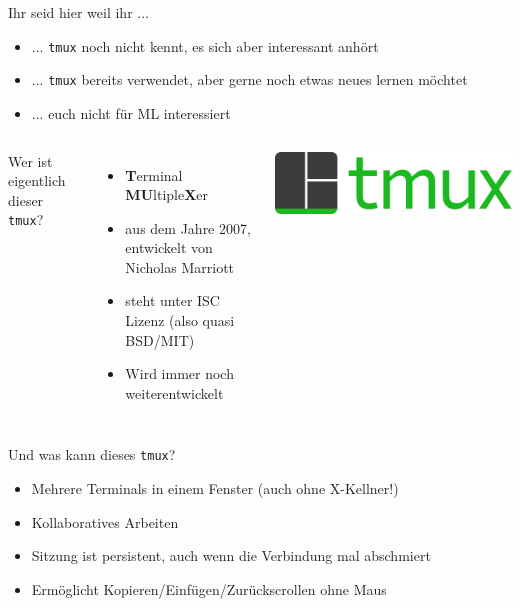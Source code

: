 \documentclass[plain]{beamer}
\title{\huge \tmux{}}
\author{Max Schik}
\newcommand{\tmux}{\texttt{tmux}}
\begin{document}
\begin{frame}
  \titlepage
\end{frame}

\begin{frame}
  Ihr seid hier weil ihr ...
  \begin{itemize}
    \item ... \tmux{} noch nicht kennt, es sich aber interessant anhört
    \item ... \tmux{} bereits verwendet, aber gerne noch etwas neues lernen möchtet
    \item ... euch nicht für ML interessiert
  \end{itemize}
\end{frame}

\begin{frame}
  \begin{columns}[onlytextwidth,T]
    \column{\dimexpr\linewidth-30mm-5mm}
    Wer ist eigentlich dieser \tmux{}?
    \begin{itemize}
      \item \textbf{T}erminal \textbf{MU}ltiple\textbf{X}er
      \item aus dem Jahre 2007, entwickelt von Nicholas Marriott
      \item steht unter ISC Lizenz (also quasi BSD/MIT)
      \item Wird immer noch weiterentwickelt
    \end{itemize}
    \column{30mm}
    \includegraphics[width=\textwidth]{imgs/Tmux_logo.png}
  \end{columns}
\end{frame}

\begin{frame}
  Und was kann dieses \tmux{}?
  \begin{itemize}
    \item Mehrere Terminals in einem Fenster (auch ohne X-Kellner!)
    \item Kollaboratives Arbeiten
    \item Sitzung ist persistent, auch wenn die Verbindung mal abschmiert
    \item Ermöglicht Kopieren/Einfügen/Zurückscrollen ohne Maus
  \end{itemize}
\end{frame}
\end{document}
